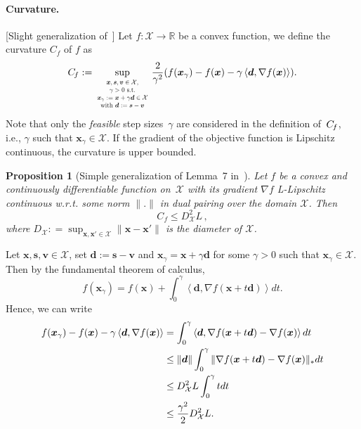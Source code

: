 \documentclass[twoside]{article}
\newcommand{\R}{\mathbb{R}}
\newcommand{\X}{\mathcal{X}}
\newcommand{\prodscal}[2]{\left\langle#1,#2\right\rangle}
\newcommand{\x}{\bm{x}}
\newcommand{\s}{\bm{s}}
\newtheorem{proposition}[definition]{Proposition}
\newcommand{\stepsize}{\gamma}
\newcommand{\Cf}{C_{\hspace{-0.08em}f}}
\newcommand{\dd}{\bm{d}}
\newcommand{\vv}{\bm{v}} %
\newcommand{\0}{\mathbf{0}} %
\begin{document}
    \paragraph{Curvature.}[Slight generalization of~\citet{jaggi2013revisiting}]  
    \label{par:curvature}
    Let $f : \X \to \R$ be a convex function, we define the curvature $C_f$ of $f$ as 
      \begin{equation} 
    \label{CurvB}
      \Cf := 
        \sup_{\substack{\scalebox{0.65}{
        $\begin{matrix}
                    \x, \s, \vv \in \X , \\ \stepsize > 0 \text{ s.t.} \\
                    \x_{\stepsize} := \x + \stepsize \dd \in \X \\ 
                    \text{with } \dd := \s - \vv 
                  \end{matrix}$
          }}}
          \frac{2}{\stepsize^2}( f(\x_{\stepsize})-f(\x)- \stepsize \prodscal{\dd}{ \nabla f(\x)}). 
          \end{equation}
    Note that only the \emph{feasible} step sizes~$\stepsize$ are considered in the definition of~$\Cf$, i.e., $\stepsize$ such that $\x_{\stepsize} \in \X$. 
    If the gradient of the objective function is Lipschitz continuous, the curvature is upper bounded. 
    \begin{proposition}[Simple generalization of Lemma~7 in~\citet{jaggi2013revisiting}]
        \label{prop:C_fbounded}
    Let $f$ be a convex and continuously differentiable function on~$\X$ with its gradient $\nabla f$ L-Lipschitz continuous w.r.t. some norm $\|.\|$ in dual pairing over the domain $\X$. Then
      \begin{equation} \label{eq:CfUpperBound}
      C_f \leq D_\X^2 L \, ,
      \end{equation}
      where $D_\X : = \sup_{\x,\x' \in \X} \|\x - \x'\|$ is the diameter of $\X$.
  \end{proposition}  
    Let $\x, \s, \vv \in \X$, set $\dd := \s - \vv$ and $\x_{\stepsize} = \x + \gamma \dd $ for some $\stepsize > 0$ such that $\x_{\stepsize} \in \X$. Then by the fundamental theorem of calculus, 
    \begin{equation}
      f(\x_{\stepsize}) = f(\x) + \int_0^\gamma \prodscal{ \dd }{\nabla f(\x + t \dd )} dt.
    \end{equation}
    Hence, we can write 
    \begin{align}
      f(\x_{\stepsize})-f(\x)- \stepsize \prodscal{\dd}{ \nabla f(\x)}
      & = \int_0^\gamma \prodscal{ \dd }{\nabla f(\x + t \dd) -  \nabla f(\x)} dt  \notag\\
      & \leq \|\dd\| \int_0^\gamma  \| \nabla f(\x + t \dd) - \nabla f(\x)\|_*dt \notag \\
      & \leq D_\X^2 L\int_0^\gamma t dt \notag \\ 
      & \leq \frac{\gamma^2}{2} D_\X^2 L.
    \end{align}
\end{document}
